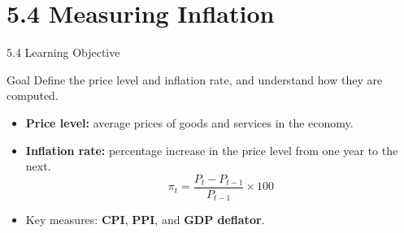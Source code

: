 \documentclass[aspectratio=169]{beamer}
\begin{document}
\section{5.4 Measuring Inflation}

\begin{frame}{5.4 Learning Objective}
\transfade
\begin{block}{Goal}
Define the price level and inflation rate, and understand how they are computed.
\end{block}
\begin{itemize}
  \item \textbf{Price level:} average prices of goods and services in the economy.
  \item \textbf{Inflation rate:} percentage increase in the price level from one year to the next.
  \[
    \pi_t = \frac{P_t - P_{t-1}}{P_{t-1}} \times 100
  \]
  \item Key measures: \textbf{CPI}, \textbf{PPI}, and \textbf{GDP deflator}.
\end{itemize}
\end{frame}
\end{document}
